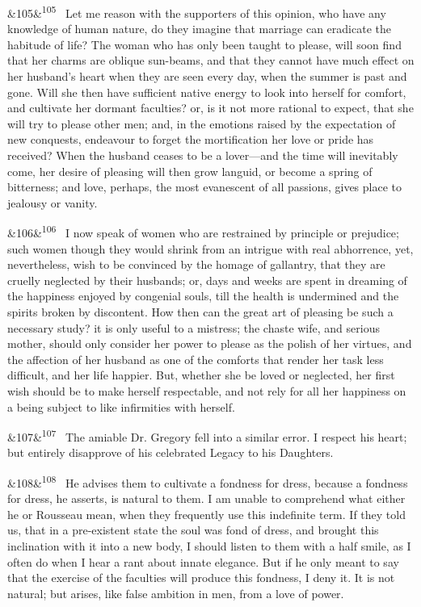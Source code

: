 \documentclass[12pt]{article}
\newcommand{\para}[1][]{\par\noindent\ifx&#1&\else\textsuperscript{\footnotesize #1}~\fi}
\begin{document}
\para[105] Let me reason with the supporters of this opinion, who have any knowledge of human nature, do they imagine that marriage can eradicate the habitude of life? The woman who has only been taught to please, will soon find that her charms are oblique sun-beams, and that they cannot have much effect on her husband's heart when they are seen every day, when the summer is past and gone. Will she then have sufficient native energy to look into herself for comfort, and cultivate her dormant faculties? or, is it not more rational to expect, that she will try to please other men; and, in the emotions raised by the expectation of new conquests, endeavour to forget the mortification her love or pride has received? When the husband ceases to be a lover---and the time will inevitably come, her desire of pleasing will then grow languid, or become a spring of bitterness; and love, perhaps, the most evanescent of all passions, gives place to jealousy or vanity.

\para[106] I now speak of women who are restrained by principle or prejudice; such women though they would shrink from an intrigue with real abhorrence, yet, nevertheless, wish to be convinced by the homage of gallantry, that they are cruelly neglected by their husbands; or, days and weeks are spent in dreaming of the happiness enjoyed by congenial souls, till the health is undermined and the spirits broken by discontent. How then can the great art of pleasing be such a necessary study? it is only useful to a mistress; the chaste wife, and serious mother, should only consider her power to please as the polish of her virtues, and the affection of her husband as one of the comforts that render her task less difficult, and her life happier. But, whether she be loved or neglected, her first wish should be to make herself respectable, and not rely for all her happiness on a being subject to like infirmities with herself.

\para[107] The amiable Dr. Gregory fell into a similar error. I respect his heart; but entirely disapprove of his celebrated Legacy to his Daughters.

\para[108] He advises them to cultivate a fondness for dress, because a fondness for dress, he asserts, is natural to them. I am unable to comprehend what either he or Rousseau mean, when they frequently use this indefinite term. If they told us, that in a pre-existent state the soul was fond of dress, and brought this inclination with it into a new body, I should listen to them with a half smile, as I often do when I hear a rant about innate elegance. But if he only meant to say that the exercise of the faculties will produce this fondness, I deny it. It is not natural; but arises, like false ambition in men, from a love of power.
\end{document}
